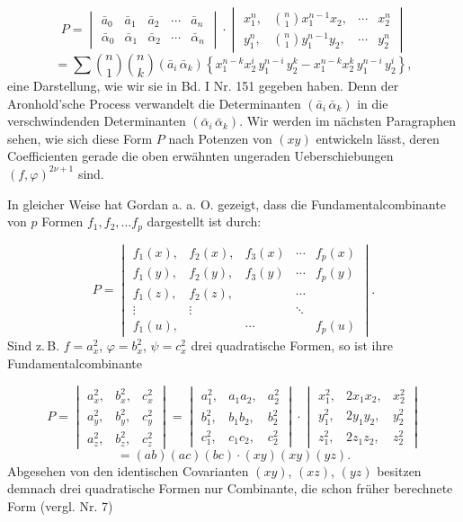\[
P = \begin{vmatrix} \bar a_0 & \bar a_1 & \bar a_2 & \cdots & \bar a_n \\ \bar \alpha_0 & \bar \alpha_1 & \bar \alpha_2 & \cdots & \bar \alpha_n \end{vmatrix} \cdot \begin{vmatrix} x_1^n, & \binom{n}{1} x_1^{n-1} x_2, & \cdots & x_2^n \\ y_1^n, & \binom{n}{1} y_1^{n-1} y_2, & \cdots & y_2^n \end{vmatrix}
\]
\[
= \sum \binom{n}{1}\binom{n}{k} (\bar a_i\, \bar \alpha_k) \left\{ x_1^{n-k} x_2^i\, y_1^{n-i}\, y_2^k - x_1^{n-k} x_2^k\, y_1^{n-i}\, y_2^i \right\},
\]
eine Darstellung, wie wir sie in Bd. I Nr. 151 gegeben haben. Denn der Aronhold'sche Process verwandelt die Determinanten $(\bar a_i\, \bar \alpha_k)$ in die verschwindenden Determinanten $(\bar \alpha_i\, \bar \alpha_k)$. Wir werden im nächsten Paragraphen sehen, wie sich diese Form $P$ nach Potenzen von $(xy)$ entwickeln lässt, deren Coefficienten gerade die oben erwähnten ungeraden Ueberschiebungen $(f, \varphi)^{2\nu+1}$ sind.

In gleicher Weise hat Gordan a. a. O. gezeigt, dass die Fundamentalcombinante von $p$ Formen $f_1, f_2, \ldots f_p$ dargestellt ist durch:

\[
P = \begin{vmatrix}
f_1(x), & f_2(x), & f_3(x) & \cdots & f_p(x) \\
f_1(y), & f_2(y), & f_3(y) & \cdots & f_p(y) \\
f_1(z), & f_2(z), & & \cdots & \\
\vdots & \vdots & & \ddots & \\
f_1(u), & & \cdots & & f_p(u)
\end{vmatrix} .
\]
Sind z.\,B. $f = a_x^2$, $\varphi = b_x^2$, $\psi = c_x^2$ drei quadratische Formen, so ist ihre Fundamentalcombinante

\[
P = \begin{vmatrix} a_x^2, & b_x^2, & c_x^2 \\ a_y^2, & b_y^2, & c_y^2 \\ a_z^2, & b_z^2, & c_z^2 \end{vmatrix}
= \begin{vmatrix} a_1^2, & a_1 a_2, & a_2^2 \\ b_1^2, & b_1 b_2, & b_2^2 \\ c_1^2, & c_1 c_2, & c_2^2 \end{vmatrix} \cdot
\begin{vmatrix} x_1^2, & 2 x_1 x_2, & x_2^2 \\ y_1^2, & 2 y_1 y_2, & y_2^2 \\ z_1^2, & 2 z_1 z_2, & z_2^2 \end{vmatrix}
\]
\[
= (ab)(ac)(bc) \cdot (xy)(xy)(yz) . %
\]
Abgesehen von den identischen Covarianten $(xy)$, $(xz)$, $(yz)$ besitzen demnach drei quadratische Formen nur  Combinante, die schon früher berechnete Form (vergl. Nr. 7)

